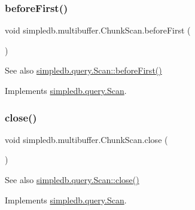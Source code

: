 \subsubsection{\texorpdfstring{before\+First()}{beforeFirst()}}
{\footnotesize\ttfamily void simpledb.\+multibuffer.\+Chunk\+Scan.\+before\+First (\begin{DoxyParamCaption}{ }\end{DoxyParamCaption})\hspace{0.3cm}{\ttfamily [inline]}}

\begin{DoxySeeAlso}{See also}
\hyperlink{interfacesimpledb_1_1query_1_1Scan_a2eceb634b69da9bf1269a4355808cc6b}{simpledb.\+query.\+Scan\+::before\+First()} 
\end{DoxySeeAlso}


Implements \hyperlink{interfacesimpledb_1_1query_1_1Scan_a2eceb634b69da9bf1269a4355808cc6b}{simpledb.\+query.\+Scan}.

\mbox{\label{classsimpledb_1_1multibuffer_1_1ChunkScan_ac05118042ff2f71f455a3fc4cd5288d0}} 
\subsubsection{\texorpdfstring{close()}{close()}}
{\footnotesize\ttfamily void simpledb.\+multibuffer.\+Chunk\+Scan.\+close (\begin{DoxyParamCaption}{ }\end{DoxyParamCaption})\hspace{0.3cm}{\ttfamily [inline]}}

\begin{DoxySeeAlso}{See also}
\hyperlink{interfacesimpledb_1_1query_1_1Scan_a260f40a8c82edaa00398bea9d698933c}{simpledb.\+query.\+Scan\+::close()} 
\end{DoxySeeAlso}


Implements \hyperlink{interfacesimpledb_1_1query_1_1Scan_a260f40a8c82edaa00398bea9d698933c}{simpledb.\+query.\+Scan}.

\mbox{\label{classsimpledb_1_1multibuffer_1_1ChunkScan_a60fb6e3568149c5284b80e339d3e3ffb}} 
